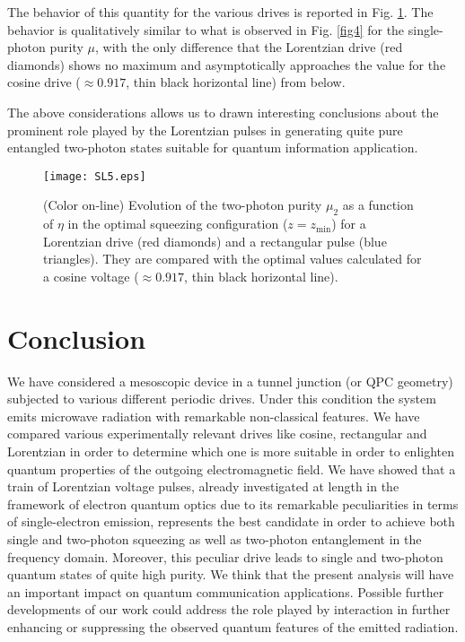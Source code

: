 \documentclass[twocolumn,showpacs,preprintnumbers,amsmath,amssymb%
 aps,
 prb,
 lengthcheck,%
]{revtex4-1}
\begin{document}
The behavior of this quantity for the various drives is reported in Fig. \ref{fig5}. The behavior is qualitatively similar to what is observed in Fig. \ref{fig4} for the single-photon purity $\mu$, with the only difference that the Lorentzian drive (red diamonds) shows no maximum and asymptotically approaches the value for the cosine drive ($\approx 0.917$, thin black horizontal line) from below. 

The above considerations allows us to drawn interesting conclusions about the prominent role played by the Lorentzian pulses in generating quite pure entangled two-photon states suitable for quantum information application. 
\begin{figure}[h]
\centering
\texttt{[image: SL5.eps]}
\caption{(Color on-line) Evolution of the two-photon purity $\mu_{2}$ as a function of $\eta$ in the optimal squeezing configuration ($z=z_{\mathrm{min}}$) for a Lorentzian drive (red diamonds) and a rectangular pulse (blue triangles). They are compared with the optimal values calculated for a cosine voltage ($\approx0.917$, thin black horizontal line).} 
\label{fig5}
\end{figure}

\section{Conclusion}\label{Conclusions}
We have considered a mesoscopic device in a tunnel junction (or QPC geometry) subjected to various different periodic drives. Under this condition the system emits microwave radiation with remarkable non-classical features. We have compared various experimentally relevant drives like cosine, rectangular and Lorentzian in order to determine which one is more suitable in order to enlighten quantum properties of the outgoing electromagnetic field. We have showed that a train of Lorentzian voltage pulses, already investigated at length in the framework of electron quantum optics due to its remarkable peculiarities in terms of single-electron emission, represents the best candidate in order to achieve both single and two-photon squeezing as well as two-photon entanglement in the frequency domain. Moreover, this peculiar drive leads to single and two-photon quantum states of quite high purity. We think that the present analysis will have an important impact on quantum communication applications. Possible further developments of our work could address the role played by interaction in further enhancing or suppressing the observed quantum features of the emitted radiation. \cite{altimiras_dynamical_2014, parlavecchio_fluctuation_2015}
\end{document}
